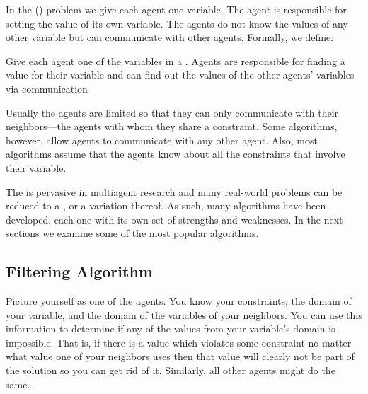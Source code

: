 \medskip

In the  ()
problem we give each agent one variable. The agent is responsible for
setting the value of its own variable. The agents do not know the
values of any other variable but can communicate with other agents.
Formally, we define:

\begin{definition} Give
  each agent one of the variables in a . Agents are
  responsible for finding a value for their variable and can find out
  the values of the other agents' variables via communication
\end{definition}

Usually the agents are limited so that they can only communicate with
their neighbors---the agents with whom they share a constraint. Some
algorithms, however, allow agents to communicate with any other agent.
Also, most algorithms assume that the agents know about all the
constraints that involve their variable. 

The  is pervasive in multiagent research and many
real-world problems can be reduced to a , or a variation
thereof. As such, many  algorithms have been developed,
each one with its own set of strengths and weaknesses. In the next
sections we examine some of the most popular algorithms.

\subsection{Filtering Algorithm}
\label{sec:filtering}

Picture yourself as one of the agents. You know your constraints, the
domain of your variable, and the domain of the variables of your
neighbors. You can use this information to determine if any of the
values from your variable's domain is impossible. That is, if there is
a value which violates some constraint no matter what value one of
your neighbors uses then that value will clearly not be part of the
solution so you can get rid of it. Similarly, all other agents might
do the same.

